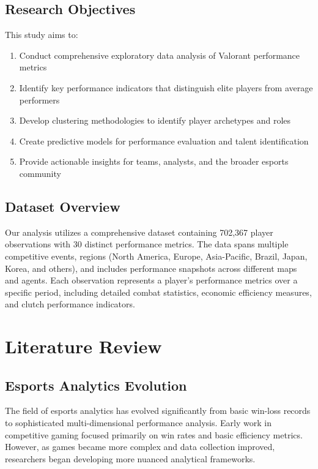\documentclass[11pt,a4paper]{article}
\begin{document}
\subsection{Research Objectives}

This study aims to:
\begin{enumerate}
\item Conduct comprehensive exploratory data analysis of Valorant performance metrics
\item Identify key performance indicators that distinguish elite players from average performers
\item Develop clustering methodologies to identify player archetypes and roles
\item Create predictive models for performance evaluation and talent identification
\item Provide actionable insights for teams, analysts, and the broader esports community
\end{enumerate}

\subsection{Dataset Overview}

Our analysis utilizes a comprehensive dataset containing 702,367 player observations with 30 distinct performance metrics. The data spans multiple competitive events, regions (North America, Europe, Asia-Pacific, Brazil, Japan, Korea, and others), and includes performance snapshots across different maps and agents. Each observation represents a player's performance metrics over a specific period, including detailed combat statistics, economic efficiency measures, and clutch performance indicators.

\section{Literature Review}

\subsection{Esports Analytics Evolution}

The field of esports analytics has evolved significantly from basic win-loss records to sophisticated multi-dimensional performance analysis. Early work in competitive gaming focused primarily on win rates and basic efficiency metrics. However, as games became more complex and data collection improved, researchers began developing more nuanced analytical frameworks.
\end{document}
